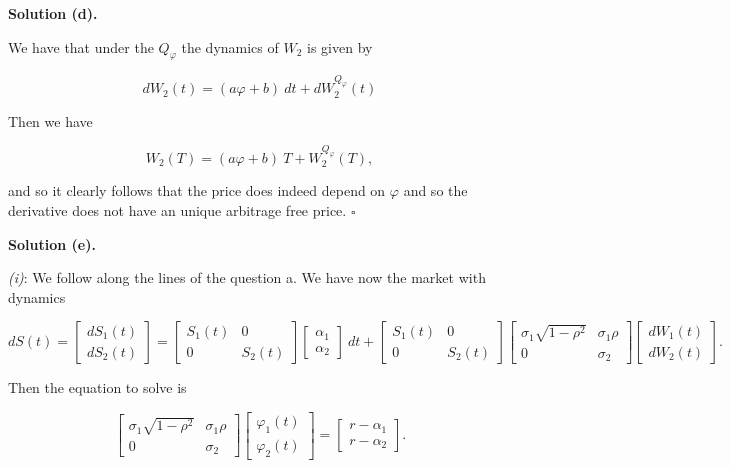 \documentclass[a4paper,12pt,openany]{book}
\begin{document}
\textbf{Solution (d).}

We have that under the \(Q_\varphi\) the dynamics of \(W_2\) is given by

\[
dW_2(t)=(a\varphi+b)\ dt+dW^{Q_\varphi}_2(t)
\]

Then we have

\[
W_2(T)=(a\varphi+b)\ T+W^{Q_\varphi}_2(T),
\]

and so it clearly follows that the price does indeed depend on \(\varphi\) and so the derivative does not have an unique arbitrage free price. \(\square\)

\noindent\makebox[\linewidth]{\rule{\textwidth}{0.4pt}}

\textbf{Solution (e).}

\emph{(i)}: We follow along the lines of the question a. We have now the market with dynamics

\[
dS(t)=
\begin{bmatrix}
dS_1(t)\\
dS_2(t)
\end{bmatrix}
=
\begin{bmatrix}
S_1(t) &0 \\
0& S_2(t)
\end{bmatrix}
\begin{bmatrix}
\alpha_1\\
\alpha_2
\end{bmatrix}
\ dt+
\begin{bmatrix}
S_1(t) &0 \\
0& S_2(t)
\end{bmatrix}
\begin{bmatrix}
\sigma_1\sqrt{1-\rho^2} & \sigma_1\rho\\
0&\sigma_2
\end{bmatrix}
\begin{bmatrix}
dW_1(t)\\
dW_2(t)
\end{bmatrix}.
\]

Then the equation to solve is

\[
\begin{bmatrix}
\sigma_1\sqrt{1-\rho^2} & \sigma_1\rho\\
0&\sigma_2
\end{bmatrix}
\begin{bmatrix}
\varphi_1(t)\\
\varphi_2(t)
\end{bmatrix}=
\begin{bmatrix}
r-\alpha_1\\
r-\alpha_2
\end{bmatrix}.
\]
\end{document}
